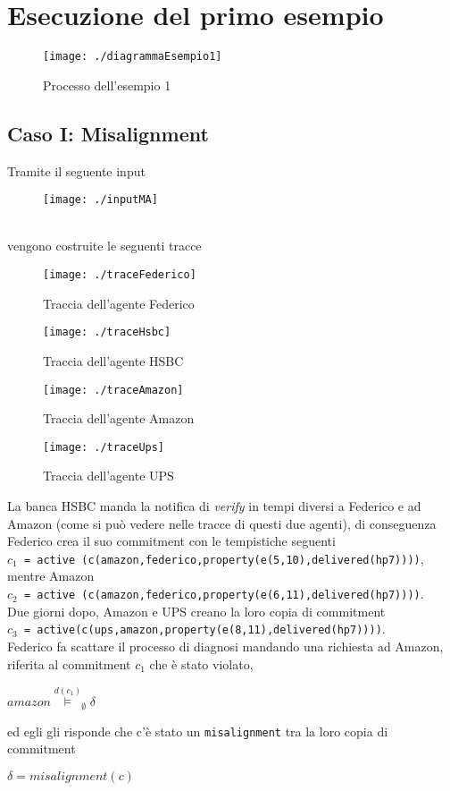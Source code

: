 \documentclass[a4paper,12pt]{report}
\begin{document}
\section{Esecuzione del primo esempio}
\begin{figure}[h]
    \texttt{[image: ./diagrammaEsempio1]}
    \caption{Processo dell'esempio 1}
    \label{diagramma1}
\end{figure}
\newpage
\subsection{Caso I: Misalignment}
Tramite il seguente input
\begin{figure}[h]
    \texttt{[image: ./inputMA]}
\end{figure}
\\vengono costruite le seguenti tracce
\begin{figure}[h]
    \texttt{[image: ./traceFederico]}
    \caption{Traccia dell'agente Federico}
    \bigskip
    \texttt{[image: ./traceHsbc]}
    \caption{Traccia dell'agente HSBC}
    \bigskip
    \texttt{[image: ./traceAmazon]}
    \caption{Traccia dell'agente Amazon}
    \bigskip
    \texttt{[image: ./traceUps]}
    \caption{Traccia dell'agente UPS}
\end{figure}
\newpage
La banca HSBC manda la notifica di \textit{verify} in tempi diversi a Federico e ad Amazon (come si può vedere nelle tracce di questi due agenti), di conseguenza Federico crea il suo commitment con le tempistiche seguenti\\\texttt{$c_1$ = active (c(amazon,federico,property(e(5,10),delivered(hp7))))}, mentre Amazon\\\texttt{$c_2$ = active (c(amazon,federico,property(e(6,11),delivered(hp7))))}.\\
Due giorni dopo, Amazon e UPS creano la loro copia di commitment\\\texttt{$c_3$ = active(c(ups,amazon,property(e(8,11),delivered(hp7))))}.\\
Federico fa scattare il processo di diagnosi mandando una richiesta ad Amazon, riferita al commitment $c_1$ che è stato violato, 
\begin{center}
    \textit{$amazon \stackrel{d(c_1)}{\models}_{\emptyset} \delta$}
\end{center}
ed egli gli risponde che c'è stato un \texttt{misalignment} tra la loro copia di commitment
\begin{center}
    \textit{$\delta = misalignment(c)$}
\end{center}
\end{document}
